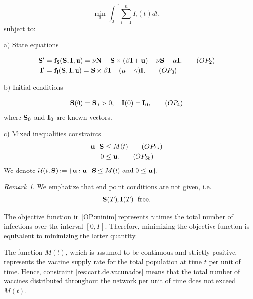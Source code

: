 \documentclass[a4paper,10pt]{article}
\theoremstyle{remark}
\newtheorem{comentario}{Remark}
\begin{document}
\begin{equation}\label{OP:minim}
 \min\limits_{u}\int_0^T\sum_{i=1}^{n} I_{i}(t) d t, \tag{$OP_1$} 
\end{equation}
subject to:
 


\noindent\textrm{a)} State  equations

 \begin{align}
    \bold{S}'&=\bold{f}_{\bold{S}}(\bold{S},\bold{I},\bold{u})=\nu\bold{N}-\bold{S}\times (\bold{\beta}\bold{I}+\bold{u})-\nu\bold{S}-\alpha\bold{I},\tag{$OP_2$} \label{eq:OP_2}\\
    \bold{I}'&=\bold{f}_{\bold{I}}(\bold{S},\bold{I},\bold{u})=\bold{S}\times \bold{\beta}\bold{I}-(\mu+\gamma)\bold{I}.\tag{$OP_3$} \label{eq:OP_3}
\end{align}

\noindent\textrm{b)} Initial conditions 

\begin{align}\label{OP:cond.inic}
 \bold{S}(0)=\bold{S}_0>0,\quad \bold{I}(0)=\bold{I}_0,\tag{$OP_4$} 
\end{align}
where $\bold{S}_0$ and $\bold{I}_0$ are known vectors.


\noindent\textrm{c)} Mixed inequalities constraints
\begin{align}
\bold{u}\cdot \bold{S}&\leq M(t)\tag{$OP_{5a}$}\label{res:cant.de.vacunados} \\  
0&\leq \bold{u}.\tag{$OP_{5b}$}\label{res:u>=0}
\end{align}
We denote $\mathcal{U}(t,\bold{S}):=\{\bold{u}:\bold{u}\cdot \bold{S}\leq M(t)\ \text{and} \  0  \leq \bold{u}\}.$





\begin{comentario}
 We emphatize that end point conditions are not given, i.e. $$\bold{S}(T), \bold{I}(T)\ \  \text{free}.$$
\end{comentario}




The objective function in \eqref{OP:minim} represents $\gamma$ times the total number of infections over the interval $[0,T]$. Therefore, minimizing the objective function is equivalent to minimizing the latter quantity.

The function $M(t)$, which is assumed to be continuous and strictly positive, represents the vaccine supply rate for the total population at time $t$ per unit of time. Hence, constraint \eqref{res:cant.de.vacunados} means that the total number of vaccines distributed throughout the network per unit of time does not exceed $M(t)$.
\end{document}
